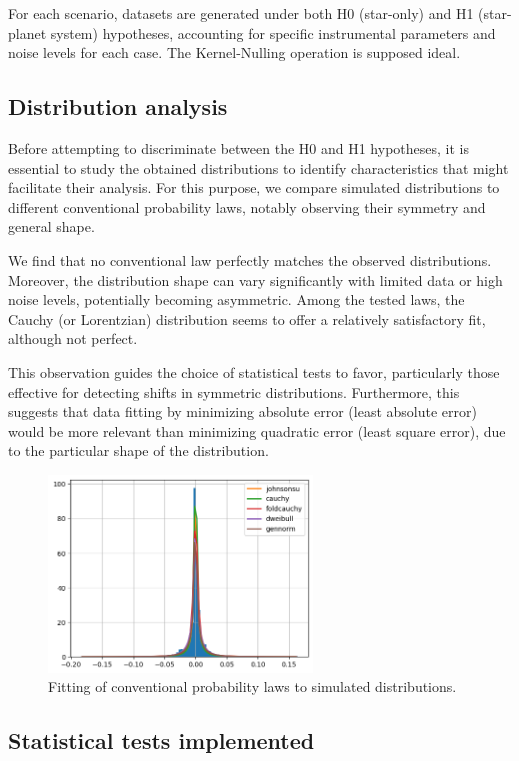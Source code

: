 \documentclass{article}
\begin{document}
For each scenario, datasets are generated under both H0 (star-only) and H1 (star-planet system) hypotheses, accounting for specific instrumental parameters and noise levels for each case. The Kernel-Nulling operation is supposed ideal.

\subsection{Distribution analysis}

Before attempting to discriminate between the H0 and H1 hypotheses, it is essential to study the obtained distributions to identify characteristics that might facilitate their analysis. For this purpose, we compare simulated distributions to different conventional probability laws, notably observing their symmetry and general shape.

We find that no conventional law perfectly matches the observed distributions. Moreover, the distribution shape can vary significantly with limited data or high noise levels, potentially becoming asymmetric. Among the tested laws, the Cauchy (or Lorentzian) distribution seems to offer a relatively satisfactory fit, although not perfect.

This observation guides the choice of statistical tests to favor, particularly those effective for detecting shifts in symmetric distributions. Furthermore, this suggests that data fitting by minimizing absolute error (least absolute error) would be more relevant than minimizing quadratic error (least square error), due to the particular shape of the distribution.

\begin{figure}[H]
\centering
\includegraphics[width=7cm]{img/model_fitting.png}
\caption{Fitting of conventional probability laws to simulated distributions.}
\label{fig:model_fitting}
\end{figure}

\subsection{Statistical tests implemented}
\end{document}
